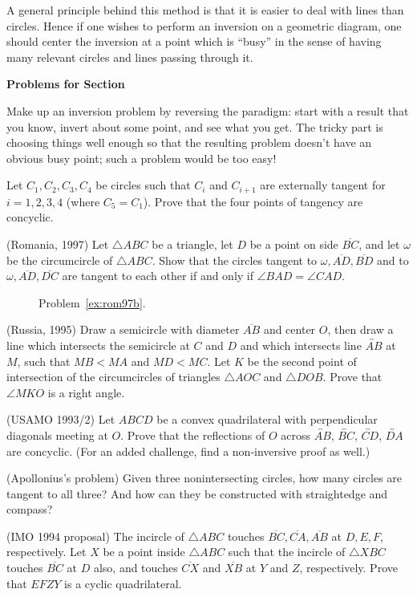 \documentclass[12pt]{book}
\newcounter{exc}
\numberwithin{exc}{section}
\numberwithin{figure}{section}
\newenvironment{exer}{\vspace{0.1in}
\noindent \textbf{Problems for Section~\thesection} \vspace{0.1in}
\begin{list}{\arabic{exc}.}{\usecounter{exc}}}{\end{list}}
\numberwithin{equation}{theorem}
\def\ii{\item}
\def\line#1{\overleftrightarrow{#1}}
\def\seg#1{\overline{#1}}
\begin{document}
A general principle behind this method 
is that it is easier to deal with lines than circles.
Hence if one wishes to perform an inversion on a geometric diagram, one
should  center the inversion at a point which is ``busy'' 
 
in the sense of having many relevant circles and lines passing through it.

\begin{exer}
\ii
Make up an inversion problem by reversing the paradigm: start with a 
result that you know, invert about some point, and see what you get.
The tricky part is choosing things well enough so that the resulting 
problem doesn't have an obvious busy point; such a problem would be too easy!

\ii
Let $C_1, C_2, C_3, C_4$ be circles such that $C_{i}$ and $C_{i+1}$
are externally tangent for $i=1, 2,3,4$ (where $C_5=C_1$). Prove
that the four points of tangency are concyclic.

\ii \label{ex:rom97b}
(Romania, 1997)
Let $\triangle ABC$ be a triangle, let $D$ be a point on side $\seg{BC}$,
 and let $\omega$ be the
circumcircle of $\triangle ABC$. 
Show that the circles tangent to $\omega, \seg{AD}, \seg{BD}$
and to $\omega, \seg{AD}, \seg{DC}$ 
are tangent to each other if and only if
$\angle BAD = \angle CAD$.
\begin{figure}[ht]
\caption{Problem~\ref{ex:rom97b}.}
\end{figure}

\ii
(Russia, 1995)
Draw a semicircle with diameter $\seg{AB}$ and center $O$, then draw a line
which intersects the semicircle at $C$ and $D$ and which
intersects line $\line{AB}$ at $M$,
such that $MB < MA$ and $MD < MC$. 
Let $K$ be the second point of intersection of
the circumcircles of triangles $\triangle AOC$ and $\triangle DOB$. 
Prove that $\angle MKO$ is a right angle.

\ii
(USAMO 1993/2)
Let $ABCD$ be a convex quadrilateral with perpendicular
diagonals meeting at $O$. Prove that the reflections of $O$
across $\line{AB}$, $\line{BC}$, $\line{CD}$, $\line{DA}$ 
are concyclic. (For an added challenge, find a 
non-inversive proof as well.)

\ii \label{ex:apoll}
(Apollonius's problem)
Given three nonintersecting circles, how many circles are
tangent to all three? And how can they be constructed with
straightedge and compass?

\ii
(IMO 1994 proposal)
The incircle of $\triangle ABC$ touches $\seg{BC}, \seg{CA}, \seg{AB}$ 
at $D,E,F$, respectively.
Let $X$ be a point inside $\triangle ABC$ 
such that the incircle of $\triangle XBC$ touches
$\seg{BC}$ at $D$ also, and touches $\seg{CX}$ and $\seg{XB}$ 
at $Y$ and $Z$,
respectively. Prove that $EFZY$ is a cyclic quadrilateral.


\end{exer}
\end{document}
